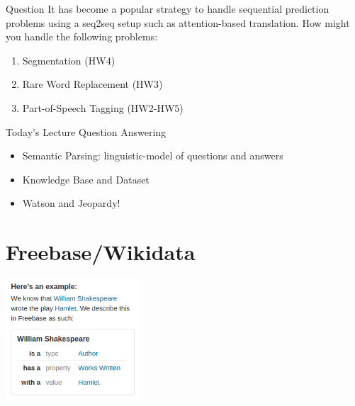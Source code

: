 \documentclass{beamer}
\begin{document}
\begin{frame}{Question}
  It has become a popular strategy to handle 
  sequential prediction problems using a seq2seq setup
  such as attention-based translation. How might you 
  handle the following problems: 

  \begin{enumerate}
  \item Segmentation (HW4)
  \item Rare Word Replacement (HW3)
  \item Part-of-Speech Tagging (HW2-HW5)
  \end{enumerate}
\end{frame}

\begin{frame}{Today's Lecture}
  Question Answering 
  \begin{itemize}
  \item Semantic Parsing: linguistic-model of questions and answers
    \air
  \item Knowledge Base and Dataset
    \air 
    
  \item Watson and Jeopardy!
  \end{itemize}
  
\end{frame}

{

}

{

}


\section{Freebase/Wikidata}

\begin{frame}
  \begin{center}
    \includegraphics[width=5cm]{freebase}
  \end{center}
\end{frame}
\end{document}
